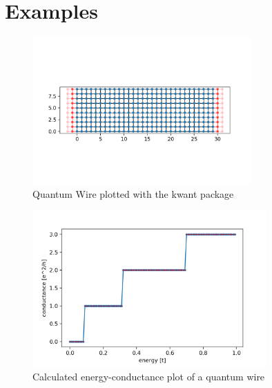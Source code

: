 \documentclass[12pt]{article}
\numberwithin{equation}{section}
\begin{document}
\newpage
\section{Examples}

\begin{figure}[h!]
  \begin{center}
  \includegraphics[width=0.75\textwidth]{QWire.png}
  \caption{Quantum Wire plotted with the kwant package}
  \label{fig:qwire}
  \end{center}
\end{figure}

\newpage

\begin{figure}[h!]
  \begin{center}
  \includegraphics[width=0.8\textwidth]{QWire_cond.png}
  \caption{Calculated energy-conductance plot of a quantum wire}
  \label{fig:qwire_cond}
  \end{center}
\end{figure}
\end{document}
